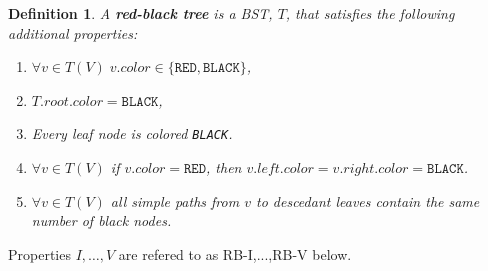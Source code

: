 \documentclass[10pt]{article}
\newtheorem{definition}{Definition}[section]
\begin{document}
\begin{definition}
  A \textbf{red-black tree} is a BST, $T$, that satisfies the following additional
  properties:
  \begin{enumerate}[label=\Roman*.]
    \item $\forall v \in T(V) \; v.color \in \{\texttt{RED}, \texttt{BLACK}\}$,
    \item $T.root.color = \texttt{BLACK}$,
    \item Every leaf node is colored \texttt{BLACK}.
    \item $\forall v \in T(V)$ if $v.color = \texttt{RED}$,
      then $v.left.color = v.right.color = \texttt{BLACK}$.
    \item $\forall v \in T(V)$ all simple paths from $v$ to descedant leaves
      contain the same number of black nodes.
  \end{enumerate}
\end{definition}
Properties $I,\ldots, V$ are refered to as RB-I,...,RB-V below. 
\end{document}
